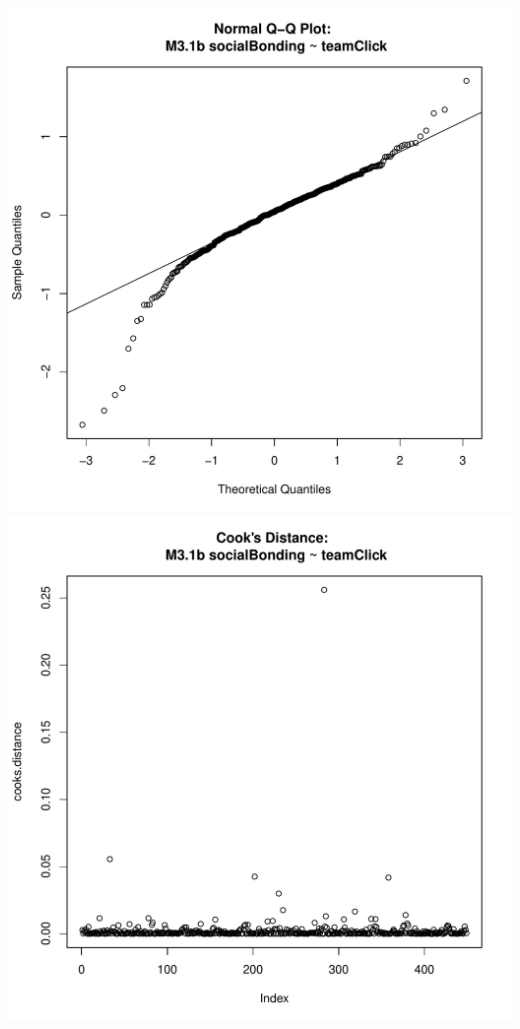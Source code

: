 \documentclass[12pt]{report}
\begin{document}
\includegraphics[scale =.4]{../images/MLM31bQQNorm.pdf}
\includegraphics[scale =.4]{../images/MLM31bCooksD.pdf}
\end{document}
